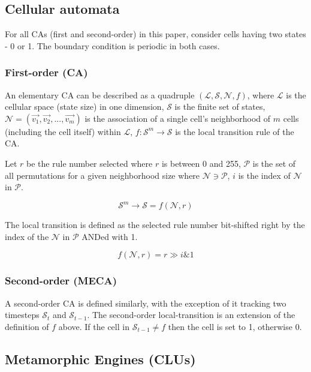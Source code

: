 \documentclass{article}
\begin{document}
\subsection{Cellular automata}

For all CAs (first and second-order) in this paper, consider cells having two states - 0 or 1. The boundary condition is periodic in both cases.

\subsubsection{First-order (CA)}

An elementary CA can be described as a quadruple $(\mathcal{L},\mathcal{S},\mathcal{N},f)$, where $\mathcal{L}$ is the cellular space (state size) in one dimension, $\mathcal{S}$ is the finite set of states, $\mathcal{N} = (\vec{v_1}, \vec{v_2}, ..., \vec{v_m})$ is the association of a single cell's neighborhood of $m$ cells (including the cell itself) within $\mathcal{L}$, $f: \mathcal{S}^{m}\rightarrow\mathcal{S}$ is the local transition rule of the CA.

Let $r$ be the rule number selected where $r$ is between 0 and 255, $\mathcal{P}$ is the set of all permutations for a given neighborhood size where $\mathcal{N} \ni \mathcal{P}$, $i$ is the index of $\mathcal{N}$ in $\mathcal{P}$.

$$
  \mathcal{S}^{m}\rightarrow\mathcal{S} = f(\mathcal{N}, r)
$$

The local transition is defined as the selected rule number bit-shifted right by the index of the $\mathcal{N}$ in $\mathcal{P}$ ANDed with 1.

$$
  f(\mathcal{N}, r) = r \gg i \mathbin{\&} 1
$$

\subsubsection{Second-order (MECA)}

A second-order CA is defined similarly, with the exception of it tracking two timesteps $\mathcal{S}_t$ and $\mathcal{S}_{t-1}$. The second-order local-transition is an extension of the definition of $f$ above. If the cell in $\mathcal{S}_{t-1} \ne f$ then the cell is set to 1, otherwise 0.

\subsection{Metamorphic Engines (CLUs)}
\end{document}
